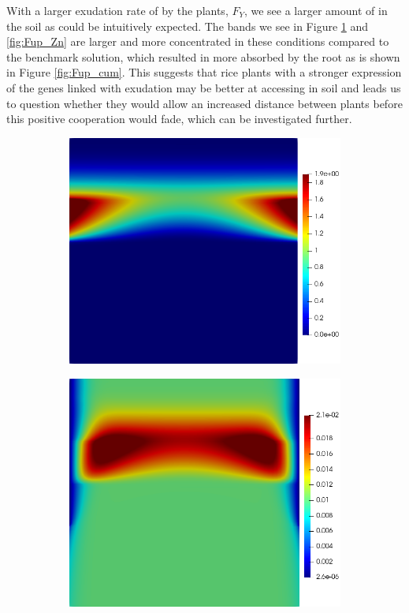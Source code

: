 \documentclass[11pt]{article}
\numberwithin{equation}{section}
\begin{document}
With a larger exudation rate of  by the plants, $F_Y$, we see a larger amount of  in the soil as could be intuitively expected. The bands we see in Figure \ref{fig:Fup_DMA} and \ref{fig:Fup_Zn} are larger and more concentrated in these conditions compared to the benchmark solution, which resulted in more  absorbed by the root as is shown in Figure \ref{fig:Fup_cum}. This suggests that rice plants with a stronger expression of the genes linked with  exudation may be better at accessing  in soil and leads us to question whether they would allow an increased distance between plants before this positive cooperation would fade, which can be investigated further.
 \begin{figure}[h]
     \centering
     \begin{subfigure}[t]{0.31\textwidth}
     \includegraphics[width=\textwidth]{Figures/testpics/IncreasedBufferDMA24.png} 
     \caption{}
     \label{fig:Fup_DMA}
     \end{subfigure}
     \begin{subfigure}[t]{0.31\textwidth}
     \includegraphics[width=\textwidth]{Figures/testpics/IncreasedBufferZn24.png}

\end{subfigure}
\end{figure}
\end{document}
